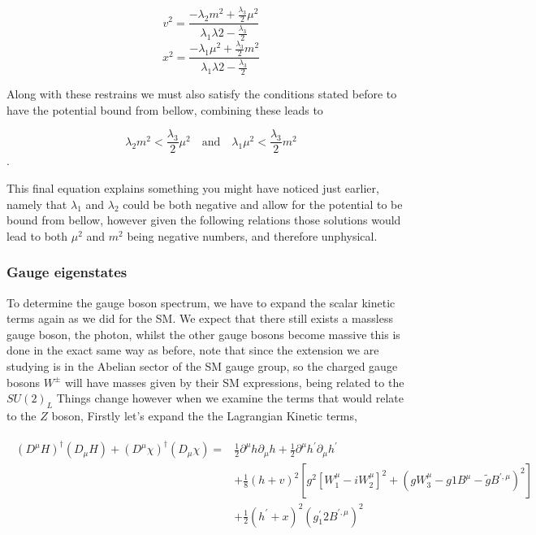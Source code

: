 \documentclass[11pt,twoside,a4paper]{article}
\begin{document}
\begin{equation}
v^2 	=\frac{-\lambda_2 m^2 + \frac{\lambda_3}{2} \mu^2}{\lambda_1 \lambda2 - \frac{\lambda_3 }{2}} 
\end{equation}
\begin{equation}
x^2 	=\frac{-\lambda_1 \mu^2 + \frac{\lambda_3}{2} m^2}{\lambda_1 \lambda2 - \frac{\lambda_3 }{2}} 
\end{equation}

Along with these restrains we must also satisfy the conditions stated before to have the potential bound from bellow, combining these leads to

\begin{equation}
\lambda_2 m^2 < \frac{\lambda_3}{2} \mu^2  \quad \text{and} \quad  \lambda_1 \mu^2 < \frac{\lambda_3}{2} m^2
\end{equation}.

This final equation explains something you might have noticed just earlier, namely that $\lambda_1$ and $\lambda_2$ could be both negative and allow for the potential to be bound from bellow, however given the following relations those solutions would lead to both $\mu^2$ and $m^2$ being negative numbers, and therefore unphysical. 


\subsubsection{Gauge eigenstates}

To determine the gauge boson spectrum, we have to expand the scalar kinetic terms again as we did for the SM. We expect that there still exists a massless gauge boson, the photon, whilst the other gauge bosons become massive this is done in the exact same way as before, note that since the extension we are studying is in the Abelian sector of the SM gauge group, so the charged gauge bosons $W^\pm$ will have masses given by their SM expressions, being related to the $SU(2)_L$ Things change however when we examine the terms that would relate to the $Z$ boson,
Firstly let's expand the the Lagrangian Kinetic terms, 

\begin{align}
\begin{split}
(D^\mu H)^\dagger (D_\mu H) + (D^\mu \chi)^\dagger (D_\mu \chi)  = & \frac{1}{2} \partial^\mu h \partial_\mu h 	+ \frac{1}{2} \partial^\mu h^\prime \partial_\mu h^\prime \\ & + \frac{1}{8} (h+v)^2 \left[ g^2 [W_1^\mu - i W_2^\mu ]^2 + \left( gW^\mu_3 - g1B^\mu - \tilde{g} B^{\prime ,\mu}\right)^2   \right] \\  & + \frac{1}{2} (h^\prime +x)^2 (g^\prime_1 2  B^{\prime, \mu})^2
\end{split}
\end{align}
\end{document}
